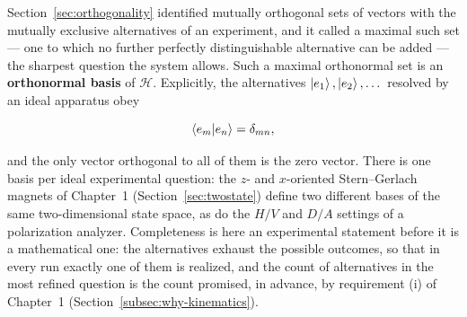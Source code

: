 Section~\ref{sec:orthogonality} identified mutually orthogonal sets of vectors with the mutually exclusive alternatives of an experiment, and it called a maximal such set --- one to which no further perfectly distinguishable alternative can be added --- the sharpest question the system allows. Such a maximal orthonormal set is an \textbf{orthonormal basis} of $\mathcal{H}$. Explicitly, the alternatives $\ket{e_1},\ket{e_2},\dots$ resolved by an ideal apparatus obey
\begin{linenomath}
    \begin{equation}
        \braket{e_m|e_n}=\delta_{mn},
        \label{eq:onb}
    \end{equation}
\end{linenomath}
and the only vector orthogonal to all of them is the zero vector. There is one basis per ideal experimental question: the $z$- and $x$-oriented Stern--Gerlach magnets of Chapter~1 (Section~\ref{sec:twostate}) define two different bases of the same two-dimensional state space, as do the $H/V$ and $D/A$ settings of a polarization analyzer. Completeness is here an experimental statement before it is a mathematical one: the alternatives exhaust the possible outcomes, so that in every run exactly one of them is realized, and the count of alternatives in the most refined question is the count promised, in advance, by requirement (i) of Chapter~1 (Section~\ref{subsec:why-kinematics}).

